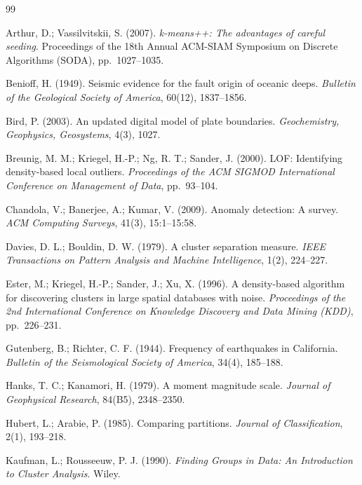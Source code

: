\documentclass[11pt,a4paper]{article}
\begin{document}
\begin{thebibliography}{99}

 Arthur, D.; Vassilvitskii, S. (2007).
\textit{k-means++: The advantages of careful seeding}.
Proceedings of the 18th Annual ACM-SIAM Symposium on Discrete Algorithms
(SODA), pp.~1027--1035.

 Benioff, H. (1949). Seismic evidence for the fault origin
of oceanic deeps. \textit{Bulletin of the Geological Society of America},
60(12), 1837--1856.

 Bird, P. (2003). An updated digital model of plate
boundaries. \textit{Geochemistry, Geophysics, Geosystems}, 4(3), 1027.

 Breunig, M. M.; Kriegel, H.-P.; Ng, R. T.; Sander, J.
(2000). LOF: Identifying density-based local outliers.
\textit{Proceedings of the ACM SIGMOD International Conference on Management of
Data}, pp.~93--104.

 Chandola, V.; Banerjee, A.; Kumar, V. (2009). Anomaly
detection: A survey. \textit{ACM Computing Surveys}, 41(3), 15:1--15:58.

 Davies, D. L.; Bouldin, D. W. (1979). A cluster
separation measure. \textit{IEEE Transactions on Pattern Analysis and Machine
Intelligence}, 1(2), 224--227.

 Ester, M.; Kriegel, H.-P.; Sander, J.; Xu, X. (1996). A
density-based algorithm for discovering clusters in large spatial databases
with noise. \textit{Proceedings of the 2nd International Conference on
Knowledge Discovery and Data Mining (KDD)}, pp.~226--231.

 Gutenberg, B.; Richter, C. F. (1944). Frequency of
earthquakes in California. \textit{Bulletin of the Seismological Society of
America}, 34(4), 185--188.

 Hanks, T. C.; Kanamori, H. (1979). A moment magnitude
scale. \textit{Journal of Geophysical Research}, 84(B5), 2348--2350.

 Hubert, L.; Arabie, P. (1985). Comparing partitions.
\textit{Journal of Classification}, 2(1), 193--218.

 Kaufman, L.; Rousseeuw, P. J. (1990).
\textit{Finding Groups in Data: An Introduction to Cluster Analysis}.
Wiley.


\end{thebibliography}
\end{document}
